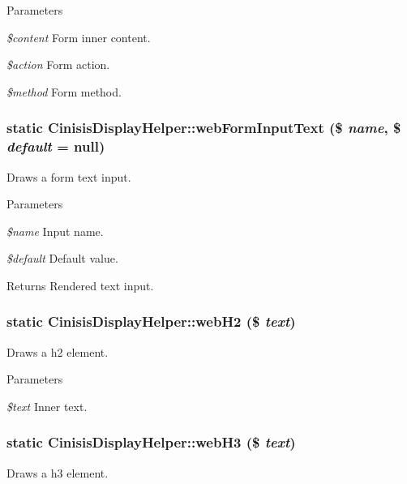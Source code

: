 \begin{DoxyParams}{Parameters}
\item[{\em \$content}]Form inner content.\item[{\em \$action}]Form action.\item[{\em \$method}]Form method. \end{DoxyParams}
\hypertarget{classCinisisDisplayHelper_a4c8934dc88cda9c7a894106b4dc7abba}{
\subsubsection[{webFormInputText}]{\setlength{\rightskip}{0pt plus 5cm}static CinisisDisplayHelper::webFormInputText (\$ {\em name}, \/  \$ {\em default} = {\ttfamily null})}}
\label{classCinisisDisplayHelper_a4c8934dc88cda9c7a894106b4dc7abba}
Draws a form text input.


\begin{DoxyParams}{Parameters}
\item[{\em \$name}]Input name.\item[{\em \$default}]Default value.\end{DoxyParams}
\begin{DoxyReturn}{Returns}
Rendered text input. 
\end{DoxyReturn}
\hypertarget{classCinisisDisplayHelper_a0f2e5c78f6fdd146df04382e497cfe94}{
\subsubsection[{webH2}]{\setlength{\rightskip}{0pt plus 5cm}static CinisisDisplayHelper::webH2 (\$ {\em text})}}
\label{classCinisisDisplayHelper_a0f2e5c78f6fdd146df04382e497cfe94}
Draws a h2 element.


\begin{DoxyParams}{Parameters}
\item[{\em \$text}]Inner text. \end{DoxyParams}
\hypertarget{classCinisisDisplayHelper_acc20c726a214895584d15a434b2f3548}{
\subsubsection[{webH3}]{\setlength{\rightskip}{0pt plus 5cm}static CinisisDisplayHelper::webH3 (\$ {\em text})}}
\label{classCinisisDisplayHelper_acc20c726a214895584d15a434b2f3548}
Draws a h3 element.


